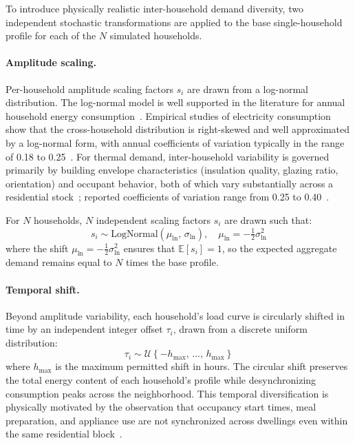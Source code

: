 \documentclass[12pt,a4paper]{report}
\begin{document}
To introduce physically realistic inter-household demand diversity, two
independent stochastic transformations are applied to the base
single-household profile for each of the $N$ simulated households.

\paragraph{Amplitude scaling.}
Per-household amplitude scaling factors $s_i$ are drawn from a log-normal
distribution.
The log-normal model is well supported in the literature for annual household
energy consumption~\cite{vtt2015lognormal, vtt2018hierarchical}.
Empirical studies of electricity consumption show that the cross-household
distribution is right-skewed and well approximated by a log-normal form,
with annual coefficients of variation typically in the range of 0.18 to
0.25~\cite{vtt2018hierarchical}.
For thermal demand, inter-household variability is governed primarily by
building envelope characteristics (insulation quality, glazing ratio,
orientation) and occupant behavior, both of which vary substantially across
a residential stock~\cite{vandenbrom2019variances}; reported coefficients of
variation range from 0.25 to 0.40~\cite{vandenbrom2019variances}.

For $N$ households, $N$ independent scaling factors $s_i$ are drawn such
that:
%
\begin{equation}
    s_i \sim \mathrm{LogNormal}\!\left(\mu_{\ln},\,\sigma_{\ln}\right),
    \quad
    \mu_{\ln} = -\tfrac{1}{2}\sigma_{\ln}^{2}
    \label{eq:lognormal}
\end{equation}
%
where the shift $\mu_{\ln} = -\tfrac{1}{2}\sigma_{\ln}^{2}$ ensures that
$\mathbb{E}[s_i] = 1$, so the expected aggregate demand remains equal to
$N$ times the base profile.

\paragraph{Temporal shift.}
Beyond amplitude variability, each household's load curve is circularly
shifted in time by an independent integer offset $\tau_i$, drawn from a
discrete uniform distribution:
%
\begin{equation}
    \tau_i \sim \mathcal{U}\!\left\{-h_{\max},\,\ldots,\,h_{\max}\right\}
    \label{eq:shift}
\end{equation}
%
where $h_{\max}$ is the maximum permitted shift in hours.
The circular shift preserves the total energy content of each household's
profile while desynchronizing consumption peaks across the neighborhood.
This temporal diversification is physically motivated by the observation
that occupancy start times, meal preparation, and appliance use are not
synchronized across dwellings even within the same residential
block~\cite{dickert2010coincidence}.
\end{document}
